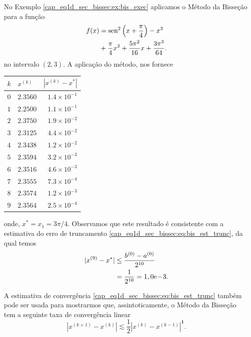 \begin{ex}\label{cap_eq1d_sec_bissec:ex:bis_convp}
  No Exemplo \ref{cap_eq1d_sec_bissec:ex:bis_exec} aplicamos o Método da Bisseção para a função
  \begin{equation}
    \begin{aligned}
      f(x) &= \operatorname{sen}^2\left(x+\frac{\pi}{4}\right) - x^3 \\
           &+ \frac{\pi}{4}x^2 + \frac{5\pi^2}{16}x + \frac{3\pi^3}{64}.
    \end{aligned}
\end{equation}
no intervalo $(2, 3)$. A aplicação do método, nos fornece
\begin{center}
  \begin{tabular}[H]{llr}
    $k$ & $x^{(k)}$ & $\left|x^{(k)}-x^{*}\right|$\\\hline
    $0$ & $2.3560$ & $1.4\times 10^{-1}$ \\
    $1$ & $2.2500$ & $1.1\times 10^{-1}$ \\
    $2$ & $2.3750$ & $1.9\times 10^{-2}$ \\
    $3$ & $2.3125$ & $4.4\times 10^{-2}$ \\
    $4$ & $2.3438$ & $1.2\times 10^{-2}$ \\
    $5$ & $2.3594$ & $3.2\times 10^{-3}$ \\
    $6$ & $2.3516$ & $4.6\times 10^{-3}$ \\
    $7$ & $2.3555$ & $7.3\times 10^{-4}$ \\
    $8$ & $2.3574$ & $1.2\times 10^{-3}$ \\
    $9$ & $2.3564$ & $2.5\times 10^{-4}$ \\\hline
  \end{tabular}
\end{center}
onde, $x^* = x_1 = 3\pi/4$. Observamos que este resultado é consistente com a estimativa do erro de truncamento \eqref{cap_eq1d_sec_bissec:eq:bis_est_trunc}, da qual temos
\begin{align}
  |x^{(9)} - x^*| &\leq \frac{b^{(0)}-a^{(0)}}{2^{10}}\\
                  &= \frac{1}{2^{10}} = 1,0\mathrm{e}\!-\!3.
\end{align}
\end{ex}

\begin{obs}
  A estimativa de convergência \eqref{cap_eq1d_sec_bissec:eq:bis_est_trunc} também pode ser usada para mostrarmos que, assintoticamente, o Método da Bisseção tem a seguinte taxa de convergência linear
  \begin{equation}
    \left|x^{(k+1)} - x^{(k)}\right| \lesssim \frac{1}{2}\left|x^{(k)} - x^{(k-1)}\right|^{\pmb{1}}.
  \end{equation}
\end{obs}

